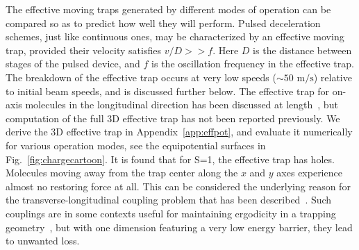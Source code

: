 \documentclass[%
 reprint,
 amsmath,amssymb,
 aps,
prl,
]{revtex4-1}
\newcommand{\SO}{{S=1}}
\begin{document}
The effective moving traps generated by different modes of operation can be compared so as to predict how well they will perform.
Pulsed deceleration schemes, just like continuous ones, may be characterized by an effective moving trap, provided their velocity satisfies $v/D >> f$. 
Here $D$ is the distance between stages of the pulsed device, and $f$ is the oscillation frequency in the effective trap. 
The breakdown of the effective trap occurs at very low speeds ($\sim\!\!50\text{ m/s}$) relative to initial beam speeds, and is discussed further below.
The effective trap for on-axis molecules in the longitudinal direction has been discussed at length~\cite{Bethlem2000,Hudson2004}, but computation of the full 3D effective trap has not been reported previously.
We derive the 3D effective trap in Appendix~\ref{app:effpot}, and evaluate it numerically for various operation modes, see the equipotential surfaces in Fig.~\ref{fig:chargecartoon}.
It is found that for \SO, the effective trap has holes. 
Molecules moving away from the trap center along the $x$ and $y$ axes experience almost no restoring force at all. 
This can be considered the underlying reason for the transverse-longitudinal coupling problem that has been described~\cite{VanDeMeerakker2006}. 
Such couplings are in some contexts useful for maintaining ergodicity in a trapping geometry~\cite{Surkov1996}, but with one dimension featuring a very low energy barrier, they lead to unwanted loss.
\end{document}
